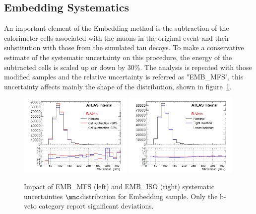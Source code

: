 
\subsection{\Ztautau Embedding Systematics}\label{sec:embsys}

An important element of the Embedding method is the subtraction of the 
calorimeter cells associated with the muons in the original \Zmumu event and their substitution with those from the simulated tau
decays. To make a conservative estimate of the systematic uncertainty on this procedure, 
the energy of the subtracted cells is scaled up or down by 30\%. The analysis is repeated with those modified 
samples and the relative uncertainty is referred as "EMB\_MFS", this uncertainty affects mainly the shape of the \mmc 
distribution, shown in figure~\ref{fig:EMBMFS}.

\begin{figure}[tp]
	\begin{center}
	\includegraphics[width=0.49\textwidth]{figure/systematics/emb_sys_NoBtagFull_MFS.png}
	\includegraphics[width=0.49\textwidth]{figure/systematics/emb_sys_NoBtagFull_Iso.png}
	\end{center}
	\caption{Impact of EMB\_MFS (left) and EMB\_ISO (right) systematic uncertainties $\mmc$distribution for Embedding sample.
	Only the b-veto category report significant deviations.}
	\label{fig:EMBMFS}
\end{figure}

